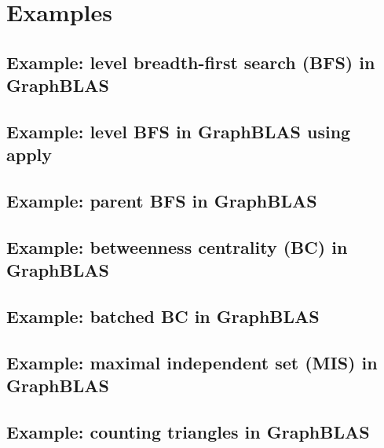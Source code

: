 
\chapter{Examples}
\label{Chp:Examples}

\pagebreak
\nolinenumbers
\section{Example: level breadth-first search (BFS) in GraphBLAS}
{\scriptsize

}
\vfill

\pagebreak
\nolinenumbers
\section{Example: level BFS in GraphBLAS using apply}
{\scriptsize

}
\vfill

\pagebreak
\nolinenumbers
\section{Example: parent BFS in GraphBLAS}
{\scriptsize

}
\vfill

\pagebreak
\nolinenumbers
\section{Example: betweenness centrality (BC) in GraphBLAS}
\label{App:BCnobatch}
{\scriptsize

}
\vfill

\pagebreak
\nolinenumbers
\section{Example: batched BC in GraphBLAS}
{\scriptsize

}
\vfill

\pagebreak
\nolinenumbers
\section{Example: maximal independent set (MIS) in GraphBLAS}
{\scriptsize

}
\vfill

\pagebreak
\nolinenumbers
\section{Example: counting triangles in GraphBLAS}
{\scriptsize

}
\vfill
\pagebreak

\linenumbers
